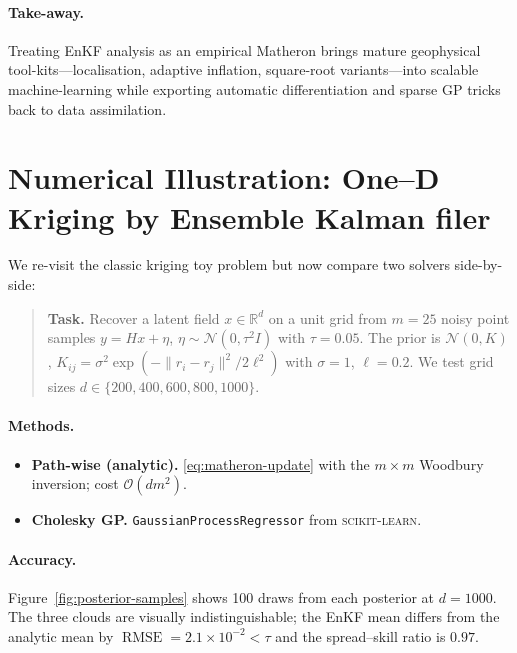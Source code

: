 \documentclass[wcp]{jmlr} %
\begin{document}
\paragraph{Take-away.}
Treating EnKF analysis as an empirical Matheron  brings mature geophysical tool-kits—localisation, adaptive inflation, square-root variants—into scalable machine-learning while exporting automatic differentiation and sparse GP tricks back to data assimilation.

\section{Numerical Illustration:  One–D Kriging by Ensemble Kalman filer}
\label{sec:numerical-demo}

We re-visit the classic kriging toy problem but now compare two solvers side-by-side:

\begin{quote}
\textbf{Task.}  Recover a latent field
$x\!\in\!\mathbb R^{d}$ on a unit grid from
$m\!=\!25$ noisy point samples
$y = Hx + \eta$, $\eta\!\sim\!\mathcal N(0,\tau^{2}I)$ with
$\tau=0.05$.  The prior is
$\mathcal N(0,K)$, $K_{ij}=\sigma^{2}\!\exp(-\lVert r_i-r_j\rVert^{2}/2\ell^{2})$
with $\sigma=1$, $\ell=0.2$.
We test grid sizes $d\in\{200,400,600,800, 1000\}$.
\end{quote}

\paragraph{Methods.}
\begin{itemize}
\item \textbf{Path-wise (analytic).}  \eqref{eq:matheron-update} with the
      $m\!\times\!m$ Woodbury inversion; cost $\mathcal O(dm^{2})$.
\item \textbf{Cholesky GP.}  \texttt{GaussianProcessRegressor}
      from \textsc{scikit-learn}.
\end{itemize}

\paragraph{Accuracy.}
Figure~\ref{fig:posterior-samples} shows 100 draws from each posterior at
$d=1000$.  The three clouds are visually indistinguishable; the EnKF
mean differs from the analytic mean by
$\operatorname{RMSE}=2.1\!\times\!10^{-2}\!<\!\tau$ and the
spread–skill ratio is $0.97$.
\end{document}

